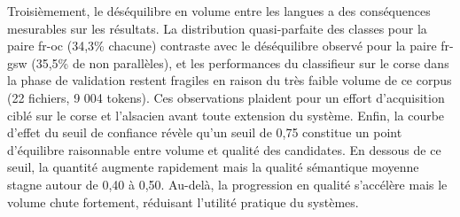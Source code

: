 Troisièmement, le déséquilibre en volume entre les langues a des conséquences
mesurables sur les résultats. La distribution quasi-parfaite des classes pour la paire
fr-oc (34,3\% chacune) contraste avec le déséquilibre observé pour la paire fr-gsw (35,5\% de non parallèles), et les performances du
classifieur sur le corse dans la phase de validation restent fragiles en raison du très faible volume de ce corpus (22 fichiers, 9 004 tokens).
Ces observations plaident pour un effort d'acquisition ciblé sur le corse et l'alsacien avant toute extension du système. Enfin, la courbe d'effet
du seuil de confiance révèle qu'un seuil de 0,75 constitue un point d'équilibre raisonnable entre volume et qualité des candidates. En dessous de
ce seuil, la quantité augmente rapidement mais la qualité sémantique moyenne stagne autour de 0,40 à 0,50. Au-delà, la progression en qualité
s'accélère mais le volume chute fortement, réduisant l'utilité pratique du systèmes.